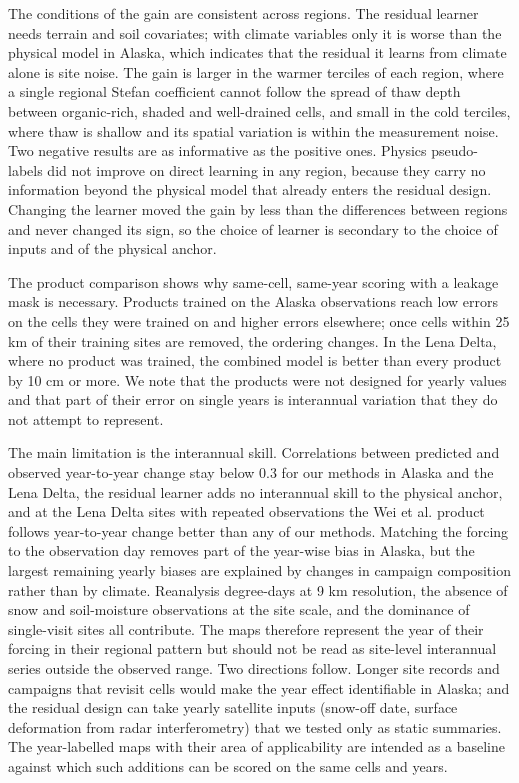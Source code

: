 The conditions of the gain are consistent across regions. The residual learner needs terrain and soil covariates; with climate variables only it is worse than the physical model in Alaska, which indicates that the residual it learns from climate alone is site noise. The gain is larger in the warmer terciles of each region, where a single regional Stefan coefficient cannot follow the spread of thaw depth between organic-rich, shaded and well-drained cells, and small in the cold terciles, where thaw is shallow and its spatial variation is within the measurement noise. Two negative results are as informative as the positive ones. Physics pseudo-labels did not improve on direct learning in any region, because they carry no information beyond the physical model that already enters the residual design. Changing the learner moved the gain by less than the differences between regions and never changed its sign, so the choice of learner is secondary to the choice of inputs and of the physical anchor.

The product comparison shows why same-cell, same-year scoring with a leakage mask is necessary. Products trained on the Alaska observations reach low errors on the cells they were trained on and higher errors elsewhere; once cells within 25 km of their training sites are removed, the ordering changes. In the Lena Delta, where no product was trained, the combined model is better than every product by 10 cm or more. We note that the products were not designed for yearly values and that part of their error on single years is interannual variation that they do not attempt to represent.

The main limitation is the interannual skill. Correlations between predicted and observed year-to-year change stay below 0.3 for our methods in Alaska and the Lena Delta, the residual learner adds no interannual skill to the physical anchor, and at the Lena Delta sites with repeated observations the Wei et al. product follows year-to-year change better than any of our methods. Matching the forcing to the observation day removes part of the year-wise bias in Alaska, but the largest remaining yearly biases are explained by changes in campaign composition rather than by climate. Reanalysis degree-days at 9 km resolution, the absence of snow and soil-moisture observations at the site scale, and the dominance of single-visit sites all contribute. The maps therefore represent the year of their forcing in their regional pattern but should not be read as site-level interannual series outside the observed range. Two directions follow. Longer site records and campaigns that revisit cells would make the year effect identifiable in Alaska; and the residual design can take yearly satellite inputs (snow-off date, surface deformation from radar interferometry) that we tested only as static summaries. The year-labelled maps with their area of applicability are intended as a baseline against which such additions can be scored on the same cells and years.
